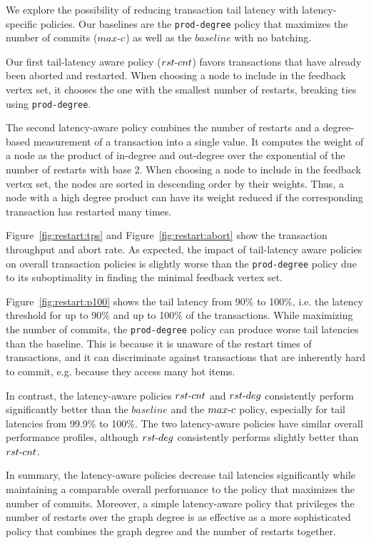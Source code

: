 We explore the possibility of reducing transaction tail latency with latency-specific policies. Our baselines are the \texttt{prod-degree} policy that maximizes the number of commits ($max\hbox{-}c$) as well as the $baseline$ with no batching. 

Our first tail-latency aware policy ($rst\hbox{-}cnt$) favors transactions that have already been aborted and restarted. When choosing a node to include in the feedback vertex set, it chooses the one with the smallest number of restarts, breaking ties using \texttt{prod-degree}.

The second latency-aware policy combines the number of restarts and a degree-based measurement of a transaction into a single value. It computes the weight of a node as the product of in-degree and out-degree over the exponential of the number of restarts with base 2. When choosing a node to include in the feedback vertex set, the nodes are sorted in descending order by their weights. Thus, a node with a high degree product can have its weight reduced if the corresponding transaction has restarted many times.

Figure~\ref{fig:restart:tps} and Figure~\ref{fig:restart:abort} show the transaction throughput and abort rate. As expected, the impact of tail-latency aware policies on overall transaction policies is slightly worse than the \texttt{prod-degree} policy due to its suboptimality in finding the minimal feedback vertex set.

Figure~\ref{fig:restart:p100} shows the tail latency from 90\% to 100\%, i.e. the latency threshold for up to 90\% and up to 100\% of the transactions. While maximizing the number of commits, the \texttt{prod-degree} policy can produce worse tail latencies than the baseline. This is because it is unaware of the restart times of transactions, and it can discriminate against transactions that are inherently hard to commit, e.g. because they access many hot items.

In contrast, the latency-aware policies $rst\hbox{-}cnt$ and $rst\hbox{-}deg$ consistently perform significantly better than the $baseline$ and the $max\hbox{-}c$ policy, especially for tail latencies from 99.9\% to 100\%. The two latency-aware policies have similar overall performance profiles, although $rst\hbox{-}deg$ consistently performs slightly better than $rst\hbox{-}cnt$.

In summary, the latency-aware policies decrease tail latencies significantly while maintaining a comparable overall performance to the policy that maximizes the number of commits. Moreover, a simple latency-aware policy that privileges the number of restarts over the graph degree is as effective as a more sophisticated policy that combines the graph degree and the number of restarts together.

